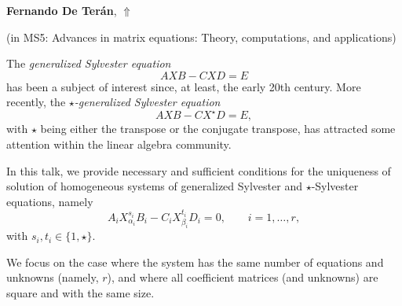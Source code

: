\documentclass[ILAS2025-program.tex]{subfiles}
\begin{document}
\hypertarget{down0319}{}\begin{ilasabstract}
    
\textbf{Fernando De Terán},  \hfill \hyperlink{up0319}{$\Uparrow$}
    
    
(in {\color{mstitle}MS5: Advances in matrix equations: Theory, computations, and applications})
        
\mtskip
    The {\em generalized Sylvester equation}
$$
AXB-CXD=E
$$
has been a subject of interest since, at least, the early 20th century. More recently, the {\em$\star$-generalized Sylvester equation}
$$
AXB-CX^\star D=E,
$$
with $\star$ being either the transpose or the conjugate transpose, has attracted some attention within the linear algebra community.

In this talk, we provide necessary and sufficient conditions for the uniqueness of solution of homogeneous systems of generalized Sylvester and $\star$-Sylvester equations, namely
$$
A_iX_{\alpha_i}^{s_i}B_i-C_iX_{\beta_i}^{t_i}D_i=0,\qquad i=1,\hdots,r,
$$
with $s_i,t_i\in\{1,\star\}$. 

We focus on the case where the system has the same number of equations and unknowns (namely, $r$), and where all coefficient matrices (and unknowns) are square and with the same size.
\end{ilasabstract}
    
\end{document}
